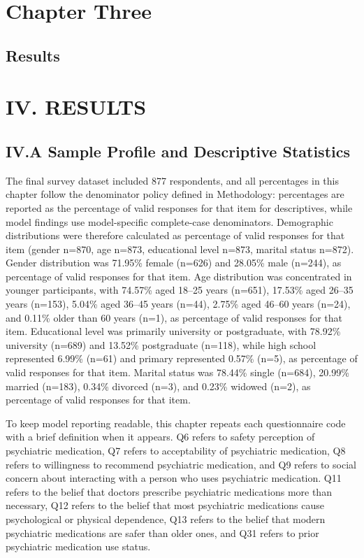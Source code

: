 \section{Chapter Three}\label{chapter-three}

\subsection{Results}\label{results}

\section{IV. RESULTS}\label{iv.-results}

\subsection{IV.A Sample Profile and Descriptive
Statistics}\label{iv.a-sample-profile-and-descriptive-statistics}

The final survey dataset included 877 respondents, and all percentages
in this chapter follow the denominator policy defined in Methodology:
percentages are reported as the percentage of valid responses for that
item for descriptives, while model findings use model-specific
complete-case denominators. Demographic distributions were therefore
calculated as percentage of valid responses for that item (gender n=870,
age n=873, educational level n=873, marital status n=872). Gender
distribution was 71.95\% female (n=626) and 28.05\% male (n=244), as
percentage of valid responses for that item. Age distribution was
concentrated in younger participants, with 74.57\% aged 18--25 years
(n=651), 17.53\% aged 26--35 years (n=153), 5.04\% aged 36--45 years
(n=44), 2.75\% aged 46--60 years (n=24), and 0.11\% older than 60 years
(n=1), as percentage of valid responses for that item. Educational level
was primarily university or postgraduate, with 78.92\% university
(n=689) and 13.52\% postgraduate (n=118), while high school represented
6.99\% (n=61) and primary represented 0.57\% (n=5), as percentage of
valid responses for that item. Marital status was 78.44\% single
(n=684), 20.99\% married (n=183), 0.34\% divorced (n=3), and 0.23\%
widowed (n=2), as percentage of valid responses for that item.

To keep model reporting readable, this chapter repeats each
questionnaire code with a brief definition when it appears. Q6 refers to
safety perception of psychiatric medication, Q7 refers to acceptability
of psychiatric medication, Q8 refers to willingness to recommend
psychiatric medication, and Q9 refers to social concern about
interacting with a person who uses psychiatric medication. Q11 refers to
the belief that doctors prescribe psychiatric medications more than
necessary, Q12 refers to the belief that most psychiatric medications
cause psychological or physical dependence, Q13 refers to the belief
that modern psychiatric medications are safer than older ones, and Q31
refers to prior psychiatric medication use status.


